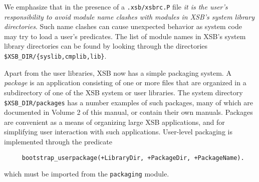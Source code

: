 We emphasize that in the presence of a {\verb|.xsb/xsbrc.P|} file {\em
it is the user's responsibility to avoid module name clashes with
modules in XSB's system library directories}.  Such name clashes can
cause unexpected behavior as system code may try to load a user's
predicates.  The list of module names in XSB's system library
directories can be found by looking through the directories {\tt
\$XSB\_DIR/\{syslib,cmplib,lib\}}.

Apart from the user libraries, XSB now has a simple packaging system.
A {\em package\/} is an application consisting of one or more files that
are organized in a subdirectory of one of the XSB system or user libraries.
The system directory \verb|$XSB_DIR/packages| has a number examples
of such packages, many of which are documented in Volume 2 of this
manual, or contain their own manuals.  Packages are convenient
as a means of organizing large XSB applications, and for simplifying
user interaction with such applications.  User-level packaging is
implemented through the predicate
\begin{verbatim}
     bootstrap_userpackage(+LibraryDir, +PackageDir, +PackageName).
\end{verbatim}
which must be imported from the {\tt packaging} module. 

